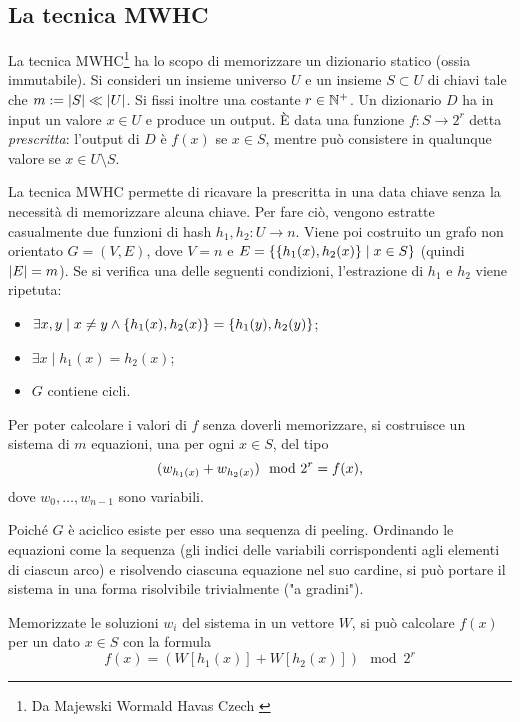 \subsection{La tecnica MWHC}
La tecnica MWHC\footnote{Da Majewski Wormald Havas Czech \cite{Majewski:96:MWHC}} ha lo scopo di memorizzare un dizionario statico (ossia immutabile).
Si consideri un insieme universo $U$ e un insieme $S\subset U$ di chiavi tale che $m:=| S |\ll| U |$. Si fissi inoltre una costante $r\in\mathbb N^+$.
Un dizionario $D$ ha in input un valore $x\in U$ e produce un output.
È data una funzione $f:S\to 2^r$ detta \emph{prescritta}: l'output di $D$ è $f(x)$ se $x\in S$, mentre può consistere in qualunque valore se $x\in U\setminus S$.

La tecnica MWHC permette di ricavare la prescritta in una data chiave senza la necessità di memorizzare alcuna chiave. Per fare ciò, vengono estratte casualmente due funzioni di hash $h_1,h_2:U\to n$.
Viene poi costruito un grafo non orientato $G=(V,E)$, dove $V=n$ e $E=\left\{ \left\{ h_1(x),h_2(x) \right\}\mid x\in S \right\}$ (quindi $| E |=m$).
Se si verifica una delle seguenti condizioni, l'estrazione di $h_1$ e $h_2$ viene ripetuta:
\begin{itemize}
	\item $\exists x,y\mid x\neq y\land \left\{ h_1(x),h_2(x) \right\}=\left\{ h_1(y),h_2(y) \right\}$;
	\item $\exists x\mid h_1(x)=h_2(x)$;
	\item $G$ contiene cicli.
\end{itemize}

Per poter calcolare i valori di $f$ senza doverli memorizzare, si costruisce un sistema di $m$ equazioni, una per ogni $x\in S$, del tipo
\begin{equation*}
	(w_{h_1(x)} + w_{h_2(x)}) \mod 2^r = f(x) \text,
\end{equation*}
dove $w_0,\dots,w_{n-1}$ sono variabili.

Poiché $G$ è aciclico esiste per esso una sequenza di peeling. Ordinando le equazioni come la sequenza (gli indici delle variabili corrispondenti agli elementi di ciascun arco) e risolvendo ciascuna equazione nel suo cardine, si può portare il sistema in una forma risolvibile trivialmente ("a gradini").

Memorizzate le soluzioni $w_i$ del sistema in un vettore $W$, si può calcolare $f(x)$ per un dato $x\in S$ con la formula
\begin{equation*}
	f(x) = (W[h_1(x)] + W[h_2(x)]) \mod 2^r
\end{equation*}

